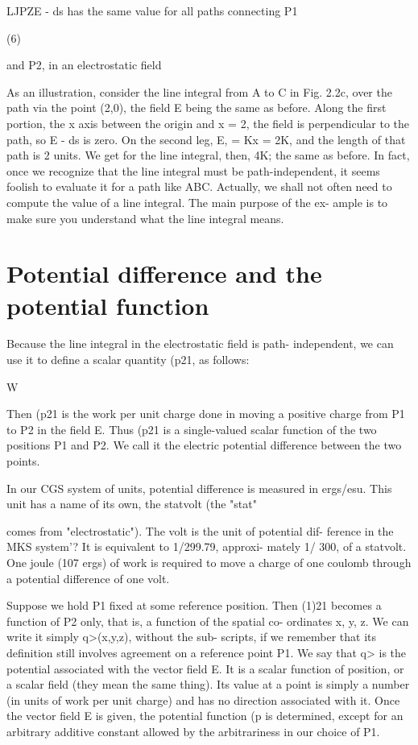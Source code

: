 LJPZE - ds has the same value for all paths connecting P1

(6)

     

and P2, in an electrostatic field

As an illustration, consider the line integral from A to C in Fig. 2.2c,
over the path via the point (2,0), the field E being the same as before.
Along the first portion, the x axis between the origin and x = 2, the
field is perpendicular to the path, so E - ds is zero. On the second leg,
E, = Kx = 2K, and the length of that path is 2 units. We get for the
line integral, then, 4K; the same as before. In fact, once we recognize
that the line integral must be path-independent, it seems foolish to
evaluate it for a path like ABC. Actually, we shall not often need to
compute the value of a line integral. The main purpose of the ex-
ample is to make sure you understand what the line integral means.

\section{Potential difference and the potential function}
Because the line integral in the electrostatic field is path-
independent, we can use it to define a scalar quantity (p21, as follows:

W

Then (p21 is the work per unit charge done in moving a positive
charge from P1 to P2 in the field E. Thus (p21 is a single-valued scalar
function of the two positions P1 and P2. We call it the electric
potential difference between the two points.

In our CGS system of units, potential difference is measured in
ergs/esu. This unit has a name of its own, the statvolt (the "stat"

comes from "electrostatic"). The volt is the unit of potential dif-
ference in the MKS system'? It is equivalent to 1/299.79, approxi-
mately 1/ 300, of a statvolt. One joule (107 ergs) of work is required
to move a charge of one coulomb through a potential difference of
one volt.

Suppose we hold P1 fixed at some reference position. Then (1)21
becomes a function of P2 only, that is, a function of the spatial co-
ordinates x, y, z. We can write it simply q>(x,y,z), without the sub-
scripts, if we remember that its definition still involves agreement
on a reference point P1. We say that q> is the potential associated with
the vector field E. It is a scalar function of position, or a scalar field
(they mean the same thing). Its value at a point is simply a number
(in units of work per unit charge) and has no direction associated
with it. Once the vector field E is given, the potential function (p
is determined, except for an arbitrary additive constant allowed by
the arbitrariness in our choice of P1.

